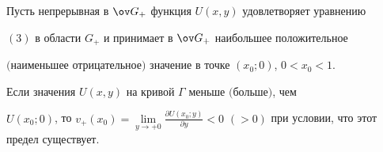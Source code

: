 \begin{lem} 


Пусть непрерывная в $\ov G_+$ функция $U(x,y)$ удовлетворяет уравнению 


$(3)$ в области $G_+$ и принимает в $\ov G_+$ наибольшее положительное 


$($наименьшее отрицательное$)$ значение в точке $(x_0;0)$, $0<x_0<1$. 


Если значения $U(x,y)$ на кривой $\Gamma$ меньше $($больше$)$, чем 


$U(x_0;0)$, то $v_+(x_0)=\lim\limits_{y\to+0} \frac{\partial 


U(x_0;y)}{\partial y}<0$ $(>0)$ при условии, что этот предел существует. 


\end{lem} 


 


